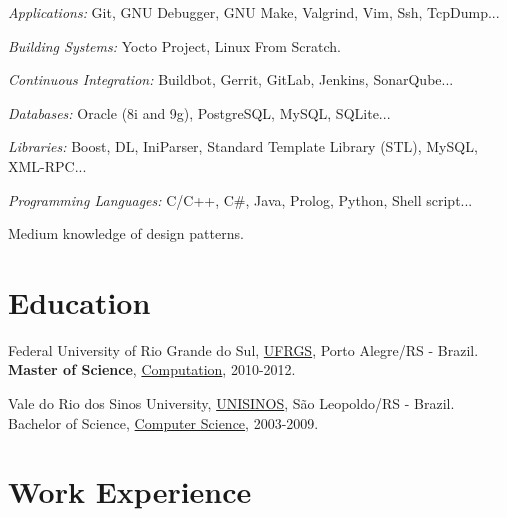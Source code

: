\documentclass[12pt,oneside,a4paper]{article}
\begin{document}
\begin{compactitem}
	\item \textit{Applications:} Git, GNU Debugger, GNU Make, Valgrind, Vim, Ssh, TcpDump...
	\item \textit{Building Systems:} Yocto Project, Linux From Scratch.
	\item \textit{Continuous Integration:} Buildbot, Gerrit, GitLab, Jenkins, SonarQube...
  \item \textit{Databases:} Oracle (8i and 9g), PostgreSQL, MySQL, SQLite...
  \item \textit{Libraries:} Boost, DL, IniParser, Standard Template Library (STL), MySQL, XML-RPC...
	\item \textit{Programming Languages:} C/C++, C\#, Java, Prolog, Python, Shell script...
	\item Medium knowledge of design patterns.
\end{compactitem}

\section*{Education}

\begin{compactitem}%
  \item Federal University of Rio Grande do Sul, \href{http://www.ufrgs.br}{UFRGS}, Porto Alegre/RS - Brazil.
		\\ \textbf{Master of Science}, \href{http://www.inf.ufrgs.br}{Computation}, 2010-2012.
  \item Vale do Rio dos Sinos University, \href{http://www.unisinos.br}{UNISINOS}, São Leopoldo/RS - Brazil.
		\\ Bachelor of Science, \href{http://www.inf.unisinos.br}{Computer Science}, 2003-2009.
\end{compactitem}

\section*{Work Experience}
\end{document}
